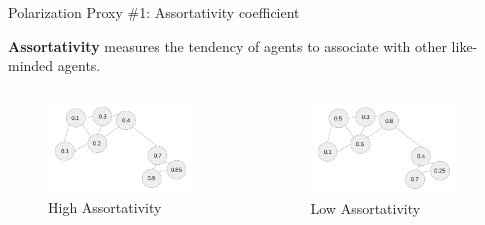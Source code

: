 \documentclass[12pt]{beamer}
\begin{document}
\begin{frame}[c]{Polarization Proxy \#1: Assortativity coefficient} %


\small 	\textbf{Assortativity} measures the tendency of agents to associate with other like-minded agents. 
	\vspace{0.2in}
\begin{columns}[onlytextwidth]
\begin{column}{.50\textwidth}
\begin{figure}
	\includegraphics[width=0.90\textwidth]{images/HighAssortDiagram.png}
	\small \caption{High Assortativity}
\end{figure}
\end{column}
\hfill
\begin{column}{.50\textwidth}
\begin{figure}
	\includegraphics[width=0.90\textwidth]{images/LowAssortDiagram.png}
	\small \caption{Low Assortativity}
\end{figure}
\end{column}
\end{columns}

\end{frame}
\end{document}
